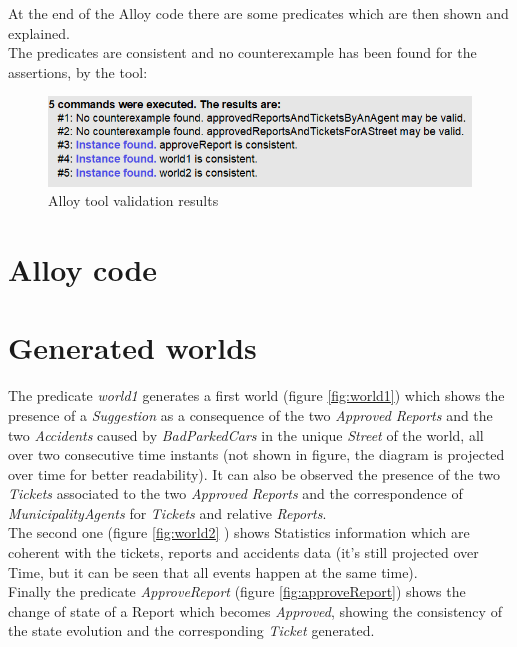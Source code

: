 \documentclass[a4paper]{report}
\begin{document}
At the end of the Alloy code there are some predicates which are then shown and explained.\\
The predicates are consistent and no counterexample has been found for the assertions, by the tool:
\begin{figure}[hp]
\includegraphics[width=\textwidth]{alloyResults}
\caption{Alloy tool validation results}
\label{fig:alloyResults}
\end{figure}

\section{Alloy code}


\section{Generated worlds}
The predicate \textit{world1} generates a first world (figure \ref{fig:world1}) which shows the presence of a \textit{Suggestion} as a consequence of the two \textit{Approved} \textit{Reports} and the two \textit{Accidents} caused by \textit{BadParkedCars} in the unique \textit{Street} of the world, all over two consecutive time instants (not shown in figure, the diagram is projected over time for better readability). It can also be observed the presence of the two \textit{Tickets} associated to the two \textit{Approved Reports} and the correspondence of \textit{MunicipalityAgents} for \textit{Tickets} and relative \textit{Reports}.\\
The second one (figure \ref{fig:world2} ) shows Statistics information which are coherent with the tickets, reports and accidents data (it's still projected over Time, but it can be seen that all events happen at the same time). \\
Finally the predicate \textit{ApproveReport} (figure \ref{fig:approveReport}) shows the change of state of a Report which becomes \textit{Approved}, showing the consistency of the state evolution and the corresponding \textit{Ticket} generated.
\end{document}
